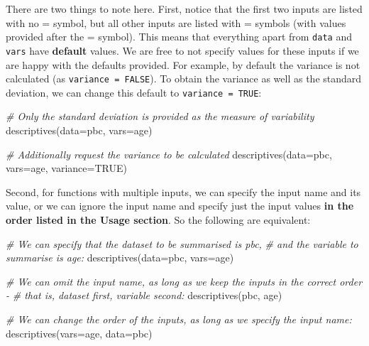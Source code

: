 \documentclass[
]{memoir}
\newenvironment{Shaded}{\begin{snugshade}}{\end{snugshade}}
\newcommand{\AttributeTok}[1]{\textcolor[rgb]{0.77,0.63,0.00}{#1}}
\newcommand{\CommentTok}[1]{\textcolor[rgb]{0.56,0.35,0.01}{\textit{#1}}}
\newcommand{\ConstantTok}[1]{\textcolor[rgb]{0.00,0.00,0.00}{#1}}
\newcommand{\FunctionTok}[1]{\textcolor[rgb]{0.00,0.00,0.00}{#1}}
\newcommand{\NormalTok}[1]{#1}
\begin{document}
There are two things to note here. First, notice that the first two inputs are listed with no = symbol, but all other inputs are listed with = symbols (with values provided after the = symbol). This means that everything apart from \texttt{data} and \texttt{vars} have \textbf{default} values. We are free to not specify values for these inputs if we are happy with the defaults provided. For example, by default the variance is not calculated (as \texttt{variance\ =\ FALSE}). To obtain the variance as well as the standard deviation, we can change this default to \texttt{variance\ =\ TRUE}:

\begin{Shaded}
\begin{Highlighting}[]
\CommentTok{\# Only the standard deviation is provided as the measure of variability}
\FunctionTok{descriptives}\NormalTok{(}\AttributeTok{data=}\NormalTok{pbc, }\AttributeTok{vars=}\NormalTok{age)}

\CommentTok{\# Additionally request the variance to be calculated}
\FunctionTok{descriptives}\NormalTok{(}\AttributeTok{data=}\NormalTok{pbc, }\AttributeTok{vars=}\NormalTok{age, }\AttributeTok{variance=}\ConstantTok{TRUE}\NormalTok{)}
\end{Highlighting}
\end{Shaded}

Second, for functions with multiple inputs, we can specify the input name and its value, or we can ignore the input name and specify just the input values \textbf{in the order listed in the Usage section}. So the following are equivalent:

\begin{Shaded}
\begin{Highlighting}[]
\CommentTok{\# We can specify that the dataset to be summarised is pbc,}
\CommentTok{\#   and the variable to summarise is age:}
\FunctionTok{descriptives}\NormalTok{(}\AttributeTok{data=}\NormalTok{pbc, }\AttributeTok{vars=}\NormalTok{age)}

\CommentTok{\# We can omit the input name, as long as we keep the inputs in the correct order {-} }
\CommentTok{\#   that is, dataset first, variable second:}
\FunctionTok{descriptives}\NormalTok{(pbc, age)}

\CommentTok{\# We can change the order of the inputs, as long as we specify the input name:}
\FunctionTok{descriptives}\NormalTok{(}\AttributeTok{vars=}\NormalTok{age, }\AttributeTok{data=}\NormalTok{pbc)}
\end{Highlighting}
\end{Shaded}
\end{document}
